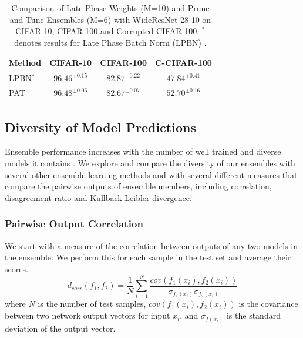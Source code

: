 \documentclass[letterpaper]{article} %
\begin{document}
\begin{table}
\centering
\begin{tabularx}{\columnwidth}{ X c c c } 
\toprule
 Method & CIFAR-10 & CIFAR-100 & C-CIFAR-100 \\
\midrule
LPBN$^*$ & $96.46^{\pm 0.15}$ & $82.87^{\pm 0.22}$ & $47.84^{\pm 0.41}$ \\
PAT & $96.48^{\pm 0.06}$ & $82.67^{\pm 0.07}$ & $52.70^{\pm 0.16}$ \\
\bottomrule
\end{tabularx}
\caption{Comparison of Late Phase Weights (M=10) and Prune and Tune Ensembles (M=6) with WideResNet-28-10 on CIFAR-10, CIFAR-100 and Corrupted CIFAR-100. $^*$ denotes results for Late Phase Batch Norm (LPBN) \cite{vonoswald2021neural}.}
\end{table}

\subsection{Diversity of Model Predictions}


Ensemble performance increases with the number of well trained and diverse models it contains \cite{bonab2016theoretical, oshiro2012forest}. We explore and compare the diversity of our ensembles with several other ensemble learning methods and with several different measures that compare the pairwise outputs of ensemble members, including correlation, disagreement ratio and Kullback-Leibler divergence.

\subsubsection{Pairwise Output Correlation}

We start with a measure of the correlation between outputs of any two models in the ensemble. We perform this for each sample in the test set and average their scores.
%
\[
    d_{corr}(f_1,f_2) = \frac{1}{N} \sum_{i=1}^{N} \frac{cov(f_1(x_i), f_2(x_i))}{\sigma_{f_1(x_i)} \sigma_{f_2(x_i)}}
\]
%
where $N$ is the number of test samples, $cov(f_1(x_i), f_2(x_i))$ is the covariance between two network output vectors for input $x_i$, and $\sigma_{f(x_i)}$ is the standard deviation of the output vector.
\end{document}
